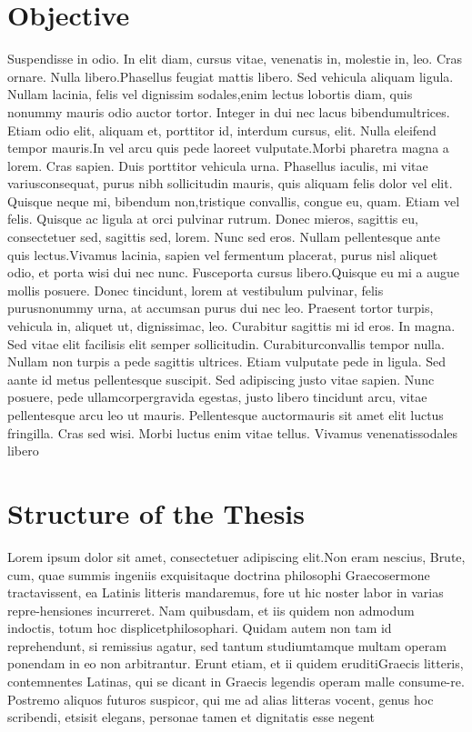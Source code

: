 \section{Objective}
\label{sec:obj}
Suspendisse in odio. In elit diam, cursus vitae, venenatis in, molestie in, leo. Cras ornare. Nulla libero.Phasellus feugiat mattis libero. Sed vehicula aliquam ligula. Nullam lacinia, felis vel dignissim sodales,enim lectus lobortis diam, quis nonummy mauris odio auctor tortor. Integer in dui nec lacus bibendumultrices. Etiam odio elit, aliquam et, porttitor id, interdum cursus, elit. Nulla eleifend tempor mauris.In vel arcu quis pede laoreet vulputate.Morbi pharetra magna a lorem. Cras sapien. Duis porttitor vehicula urna. Phasellus iaculis, mi vitae variusconsequat, purus nibh sollicitudin mauris, quis aliquam felis dolor vel elit. Quisque neque mi, bibendum non,tristique convallis, congue eu, quam. Etiam vel felis. Quisque ac ligula at orci pulvinar rutrum. Donec mieros, sagittis eu, consectetuer sed, sagittis sed, lorem. Nunc sed eros. Nullam pellentesque ante quis lectus.Vivamus lacinia, sapien vel fermentum placerat, purus nisl aliquet odio, et porta wisi dui nec nunc. Fusceporta cursus libero.Quisque eu mi a augue mollis posuere. Donec tincidunt, lorem at vestibulum pulvinar, felis purusnonummy urna, at accumsan purus dui nec leo. Praesent tortor turpis, vehicula in, aliquet ut, dignissimac, leo. Curabitur sagittis mi id eros. In magna. Sed vitae elit facilisis elit semper sollicitudin. Curabiturconvallis tempor nulla. Nullam non turpis a pede sagittis ultrices. Etiam vulputate pede in ligula. Sed aante id metus pellentesque suscipit. Sed adipiscing justo vitae sapien. Nunc posuere, pede ullamcorpergravida egestas, justo libero tincidunt arcu, vitae pellentesque arcu leo ut mauris. Pellentesque auctormauris sit amet elit luctus fringilla. Cras sed wisi. Morbi luctus enim vitae tellus. Vivamus venenatissodales libero
%
\section{Structure of the Thesis}
\label{sec:structure}
Lorem ipsum dolor sit amet, consectetuer adipiscing elit.Non eram nescius, Brute, cum, quae summis ingeniis exquisitaque doctrina philosophi Graecosermone tractavissent, ea Latinis litteris mandaremus, fore ut hic noster labor in varias repre-hensiones incurreret. Nam quibusdam, et iis quidem non admodum indoctis, totum hoc displicetphilosophari. Quidam autem non tam id reprehendunt, si remissius agatur, sed tantum studiumtamque multam operam ponendam in eo non arbitrantur. Erunt etiam, et ii quidem eruditiGraecis litteris, contemnentes Latinas, qui se dicant in Graecis legendis operam malle consume-re. Postremo aliquos futuros suspicor, qui me ad alias litteras vocent, genus hoc scribendi, etsisit elegans, personae tamen et dignitatis esse negent
